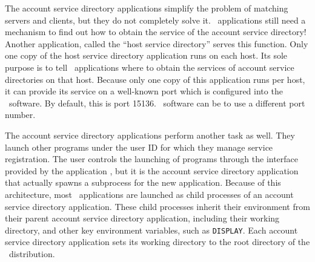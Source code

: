 The account service directory applications simplify the problem
of matching servers and clients, but they do not completely solve
it.  \OOMMF\ applications still need a mechanism to find out how
to obtain the service of the account service directory!
Another application, called the ``host service directory'' serves
this function.  Only one copy of the host service directory application
runs on each host.  Its sole purpose is to tell \OOMMF\ applications
where to obtain the services of account service directories on that
host.  Because only one copy of this application runs per host,
it can provide its service on a well-known port which is
configured into the \OOMMF\ software.  By default, this is port 15136.
\OOMMF\ software can be 
to use a different port number.

The account service directory applications perform another task
as well.  They launch other programs under the user ID for which
they manage service registration.  The user controls the launching
of programs through the interface provided by the application
, but it is the account service directory
application that actually spawns a subprocess for the new application.
Because of this architecture, most \OOMMF\ applications are launched
as child processes of an account service directory application.  These
child processes inherit their 
environment
from their parent account
service directory application, including their working directory, and
other key environment 
variables, 
such as {\tt DISPLAY}. 
Each account
service directory application sets its 
working directory
to the root
directory of the \OOMMF\ distribution.  

